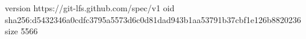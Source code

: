 version https://git-lfs.github.com/spec/v1
oid sha256:d5432346a0cdfc3795a5573d6c0d81dad943b1aa53791b37cbf1e126b8820236
size 5566
